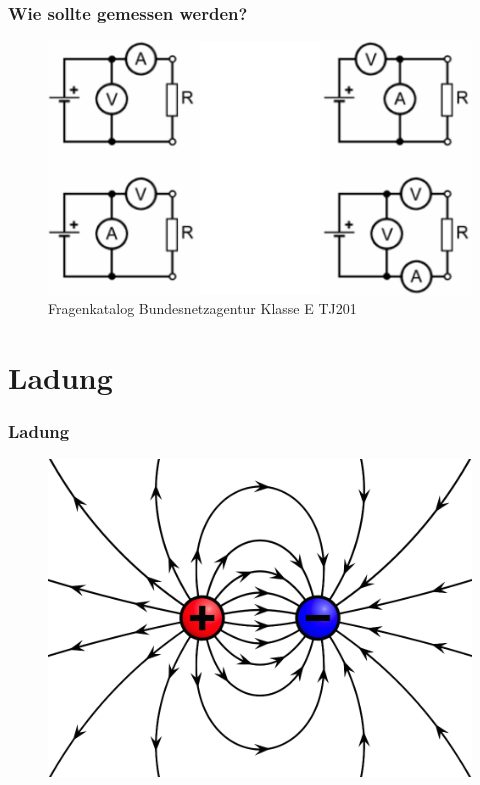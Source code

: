 \begin{frame}
    \frametitle{Wie sollte gemessen werden?}
         \begin{figure}
    \includegraphics[width=\textwidth,height=.75\textheight,keepaspectratio]{e02/stromSpannung.png}
    \caption{Fragenkatalog Bundesnetzagentur Klasse E TJ201}
  \end{figure}
\end{frame}

\section*{Ladung}

\begin{frame}
    \frametitle{Ladung}
     \begin{center}
    \begin{figure}
      \includegraphics[width=\textwidth,height=.75\textheight,keepaspectratio]{e02/ladung.png}
    \end{figure}
  \end{center}
\end{frame}


